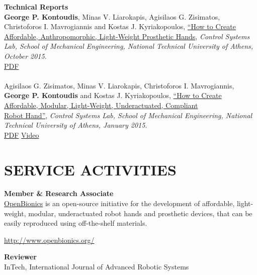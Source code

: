 \documentclass[11pt]{res} %
\begin{document}
\begin{resume}
\small\textbf {Technical Reports}
\\\textbf {\rbrack \hspace{0.05cm}}\small\textbf{George P. Kontoudis}, Minas V. Liarokapis, Agisilaos G. Zisimatos, Christoforos I. Mavrogiannis and Kostas J. Kyriakopoulos, \underline{``How to Create Affordable, Anthropomorphic, Light-Weight
Prosthetic Hands}, {\it Control Systems Lab, School of Mechanical Engineering, National Technical University of Athens, October 2015}. 
\\\href{http://www.georgekontoudis.com/Publications/TR2015_OpenBionics_ProstheticHandsGuide.pdf}
{\lbrack PDF\rbrack}
\\\\ \textbf {\rbrack \hspace{0.05cm}}Agisilaos G. Zisimatos, Minas V. Liarokapis, Christoforos I. Mavrogiannis, \small\textbf{George P. Kontoudis} and Kostas J. Kyriakopoulos, \underline{``How to Create Affordable, Modular, Light-Weight, Underactuated, Compliant }\\\underline{Robot Hand''}, {\it Control Systems Lab, School of Mechanical Engineering, National Technical University of Athens, January 2015}.\\
\href{http://www.georgekontoudis.com/Publications/TR2015_OpenBionics_RobotHandsGuide.pdf}{\lbrack PDF\rbrack}
\href{https://www.youtube.com/watch?v=Z8mkwvJW-Xs}{\lbrack Video\rbrack}

\vspace{0in} %

\section{SERVICE ACTIVITIES} 
\vspace{4pt} %
\small\textbf{Member \& Research Associate}\\
\underline{OpenBionics} is an open-source initiative for the development of affordable, light-weight, modular, underactuated
robot hands and prosthetic devices, that can be easily reproduced using off-the-shelf materials. \begin {center}
\url{http://www.openbionics.org/}
\end {center}
\small\textbf{Reviewer}
\\  InTech, International Journal of Advanced Robotic Systems
\newpage


\end{resume}
\end{document}
